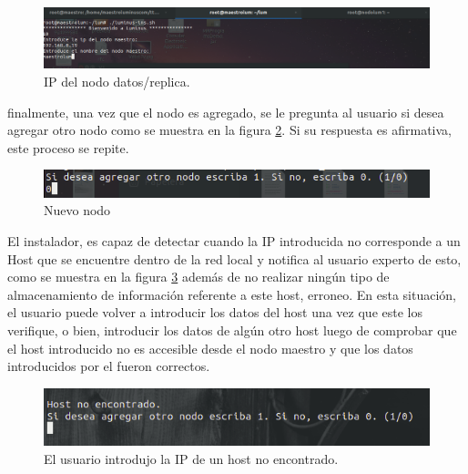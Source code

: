 \begin{figure}[H]
	\begin{center}	
		\includegraphics[width=.7\textwidth]{capitulo5/images/ipmaestro.png}
		\caption{IP del nodo datos/replica.}
		\label{fig:esclavo}
	\end{center}
\end{figure}
finalmente, una vez que el nodo es agregado, se le pregunta al usuario si desea agregar otro nodo como se muestra en la figura \ref{fig:nuevonodo}. Si su respuesta es afirmativa, este proceso se repite. 
\begin{figure}[H]
	\begin{center}	
		\includegraphics[width=.7\textwidth]{capitulo5/images/copiadohosts.png}
		\caption{Nuevo nodo}
		\label{fig:nuevonodo}
	\end{center}
\end{figure}
El instalador, es capaz de detectar cuando la IP introducida no corresponde a un Host que se encuentre dentro de la red local y notifica al usuario experto de esto, como se muestra en la figura \ref{fig:hostnoencontrado} además de no realizar ningún tipo de almacenamiento de información referente a este host, erroneo.
En esta situación, el usuario puede volver a introducir los datos del host una vez que este los verifique, o bien, introducir los datos de algún otro host luego de comprobar que el host introducido no es accesible desde el nodo maestro y que los datos introducidos por el fueron correctos.
\\
\begin{figure}[H]
	\hypertarget{fig:hostnoencontrado}{\hspace{1pt}}
	\begin{center}	
		\includegraphics[width=.7\textwidth]{capitulo5/images/hostno.png}
		\caption{El usuario introdujo la IP de un host no encontrado.}
		\label{fig:hostnoencontrado}
	\end{center}
\end{figure}
